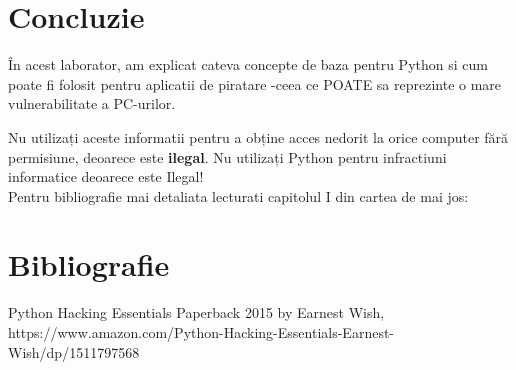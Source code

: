 \documentclass[oneside,20pt]{article}          %
\begin{document}
\section{Concluzie}
În acest laborator, am explicat cateva concepte de baza pentru Python si cum poate fi folosit pentru aplicatii de piratare -ceea ce POATE sa reprezinte o mare vulnerabilitate a PC-urilor.

Nu utilizați aceste informatii pentru a obține acces nedorit la orice computer fără permisiune, deoarece este \textbf{ilegal}. Nu utilizați Python pentru infractiuni informatice deoarece este Ilegal!\\

Pentru bibliografie mai detaliata lecturati capitolul I din cartea de mai jos:
\section{Bibliografie}

Python Hacking Essentials Paperback 2015 by Earnest Wish, \\
https://www.amazon.com/Python-Hacking-Essentials-Earnest-Wish/dp/1511797568
\end{document}
